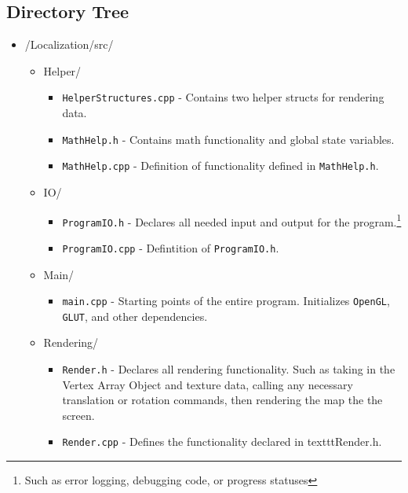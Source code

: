\documentclass[a4paper,11pt]{article}
\begin{document}
        \subsection{Directory Tree}
        \begin{itemize}
        \item /Localization/src/
            \begin{itemize}
            \item Helper/
                \begin{itemize}
                    \item \texttt{HelperStructures.cpp} - Contains two helper structs for rendering data.
                    \item \texttt{MathHelp.h} - Contains math functionality and global state variables.
                    \item \texttt{MathHelp.cpp} - Definition of functionality defined in \texttt{MathHelp.h}.
                \end{itemize}
            \item IO/
                \begin{itemize}
                    \item \texttt{ProgramIO.h} - Declares all needed input and output for the program.\footnote{Such as error logging, debugging code, or progress statuses}
                    \item \texttt{ProgramIO.cpp} - Defintition of \texttt{ProgramIO.h}.
                \end{itemize}
            \item Main/
                \begin{itemize}
                    \item \texttt{main.cpp} - Starting points of the entire program. Initializes \texttt{OpenGL}, \texttt{GLUT}, and other dependencies.
                \end{itemize}
            \item Rendering/
                \begin{itemize}
                    \item \texttt{Render.h} - Declares all rendering functionality. Such as taking in the Vertex Array Object and texture data, calling any necessary translation or rotation commands, then rendering the map the the screen.
                    \item \texttt{Render.cpp} - Defines the functionality declared in texttt{Render.h}.
                \end{itemize}

\end{itemize}
\end{itemize}
\end{document}
